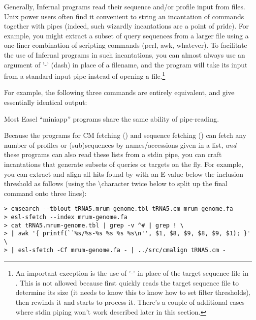 Generally, Infernal programs read their sequence and/or profile input
from files. Unix power users often find it convenient to string an
incantation of commands together with pipes (indeed, such wizardly
incantations are a point of pride). For example, you might extract a
subset of query sequences from a larger file using a one-liner
combination of scripting commands (perl, awk, whatever). To facilitate
the use of Infernal programs in such incantations, you can almost
always use an argument of '-' (dash) in place of a filename, and the
program will take its input from a standard input pipe instead of
opening a file.\footnote{An important exception is the use of '-' in
place of the target sequence file in . This is not
allowed because  first quickly reads the target
sequence file to determine its size (it needs to know this to know how
to set filter thresholds), then rewinds it and starts to process
it. There's a couple of additional cases where stdin piping won't work
described later in this section.}

For example, the following three commands are entirely equivalent, and
give essentially identical output:




Most Easel ``miniapp'' programs share the same ability of pipe-reading.

Because the programs for CM fetching () and
sequence fetching () can fetch any number of profiles
or (sub)sequences by names/accessions given in a list, \emph{and} these
programs can also read these lists from a stdin pipe, you can craft
incantations that generate subsets of queries or targets on the
fly. For example, you can extract and align all hits found by
 with an E-value below the inclusion threshold as 
follows (using the \textbackslash character twice below to split up the final
command onto three lines):

\indent\indent\small\verb+> cmsearch --tblout tRNA5.mrum-genome.tbl tRNA5.cm mrum-genome.fa+ \\
\indent\indent\small\verb+> esl-sfetch --index mrum-genome.fa+ \\
\indent\indent\small\verb+> cat tRNA5.mrum-genome.tbl | grep -v ^# | grep ! \ + \\
\indent\indent\small\verb+> | awk '{ printf(``%s/%s-%s %s %s %s\n'', $1, $8, $9, $8, $9, $1); }' \ + \\
\indent\indent\small\verb+> | esl-sfetch -Cf mrum-genome.fa - | ../src/cmalign tRNA5.cm - + \\

